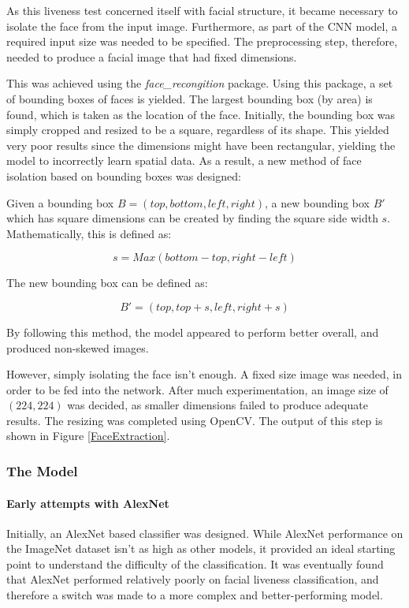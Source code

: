 \documentclass[12pt,a4paper]{article}
\begin{document}
            As this liveness test concerned itself with facial structure, it became necessary to isolate the face from the input image. Furthermore, as part of the CNN model, a required input size was needed to be specified. 
            The preprocessing step, therefore, needed to produce a facial image that had fixed dimensions.

            This was achieved using the \emph{face\_recongition} package. Using this package, a set of bounding boxes of faces is yielded. The largest bounding box (by area) is found, which is taken as the location of the face. Initially, the bounding box was simply cropped and resized to be a square, regardless of its shape. This yielded very poor results  since the dimensions might have been rectangular, yielding the model to incorrectly learn spatial data. As a result, a new method of face isolation based on bounding boxes was designed:
            
            Given a bounding box $B = (top, bottom, left, right)$, a new bounding box $B'$ which has square dimensions can be created by finding the square
            side width $s$. Mathematically, this is defined as:

                $$s = Max(bottom - top, right - left)$$


                The new bounding box can be defined as:


                $$B' = (top, top + s, left, right + s)$$


                By following this method, the model appeared to perform better overall, and produced non-skewed images.

                However, simply isolating the face isn't enough. A fixed size image was needed, in order to be fed into the network. After much experimentation, an image size of $(224, 224)$
                was decided, as smaller dimensions failed to produce adequate results. The resizing was completed using OpenCV. The output of this step is shown in Figure \ref{FaceExtraction}.

                
            \subsubsection{The Model}
               


                \paragraph{Early attempts with AlexNet}
                Initially, an AlexNet based classifier was designed. While AlexNet performance on the ImageNet dataset isn't as high as other models, it provided an ideal starting point to understand the difficulty of the classification. It was eventually found that AlexNet performed relatively poorly on facial liveness classification, and therefore a switch was made to a more complex and better-performing model.
\end{document}
